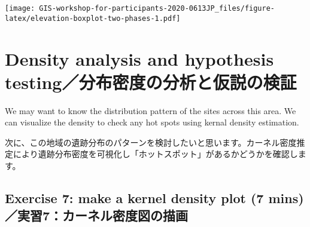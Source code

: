 \documentclass[
  xelatex,ja=standard]{bxjsarticle}
\newenvironment{Shaded}{\begin{snugshade}}{\end{snugshade}}
\newcommand{\CommentTok}[1]{\textcolor[rgb]{0.56,0.35,0.01}{\textit{#1}}}
\newcommand{\DataTypeTok}[1]{\textcolor[rgb]{0.13,0.29,0.53}{#1}}
\newcommand{\KeywordTok}[1]{\textcolor[rgb]{0.13,0.29,0.53}{\textbf{#1}}}
\newcommand{\NormalTok}[1]{#1}
\newcommand{\OperatorTok}[1]{\textcolor[rgb]{0.81,0.36,0.00}{\textbf{#1}}}
\newcommand{\StringTok}[1]{\textcolor[rgb]{0.31,0.60,0.02}{#1}}
\begin{document}
\begin{Shaded}
\end{Shaded}

\texttt{[image: GIS-workshop-for-participants-2020-0613JP\_files/figure-latex/elevation-boxplot-two-phases-1.pdf]}

\hypertarget{density-analysis-and-hypothesis-testingux5206ux5e03ux5bc6ux5ea6ux306eux5206ux6790ux3068ux4eeeux8aacux306eux691cux8a3c}{%
\section{Density analysis and hypothesis
testing／分布密度の分析と仮説の検証}\label{density-analysis-and-hypothesis-testingux5206ux5e03ux5bc6ux5ea6ux306eux5206ux6790ux3068ux4eeeux8aacux306eux691cux8a3c}}

We may want to know the distribution pattern of the sites across this
area. We can visualize the density to check any hot spots using kernal
density estimation.

次に、この地域の遺跡分布のパターンを検討したいと思います。カーネル密度推定により遺跡分布密度を可視化し「ホットスポット」があるかどうかを確認します。

\hypertarget{exercise-7-make-a-kernel-density-plot-7-minsux5b9fux7fd27ux30abux30fcux30cdux30ebux5bc6ux5ea6ux56f3ux306eux63cfux753b}{%
\subsection{Exercise 7: make a kernel density plot (7
mins)／実習7：カーネル密度図の描画}\label{exercise-7-make-a-kernel-density-plot-7-minsux5b9fux7fd27ux30abux30fcux30cdux30ebux5bc6ux5ea6ux56f3ux306eux63cfux753b}}
\end{document}
